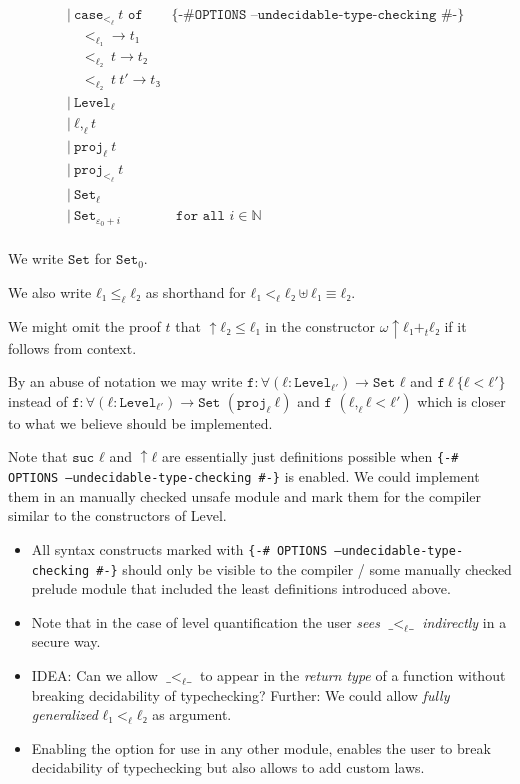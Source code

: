 \documentclass[runningheads,fleqn]{llncs}
\begin{document}
\begin{align*}
  &|\ \texttt{case}_{<_ℓ} \ t \texttt{ of } & \texttt{\{-\# OPTIONS --undecidable-type-checking \#-\}} \\
  & \quad <_{ℓ₁}→ t₁ \\
  & \quad <_{ℓ₂} \ t → t₂ \\
  & \quad <_{ℓ₂} \ t \ t′ → t₃ \\
  &|\ \texttt{Level}_ℓ \\
  &|\ ℓ ,_ℓ t \\  
  &|\ \texttt{proj}_ℓ \ t \\
  &|\ \texttt{proj}_{<_ℓ} \ t \\
  &|\ \texttt{Set}_ℓ \\
  &|\ \texttt{Set}_{ε_0+i} & \texttt{ for all } i ∈ ℕ \\
\end{align*}

We write $\texttt{Set}$ for $\texttt{Set}_0$.

We also write $ℓ₁ ≤_ℓ ℓ₂$ as shorthand for $ℓ₁ <_ℓ ℓ₂ ⊎ ℓ₁ ≡ ℓ₂$.


We might omit the proof $t$ that $↑ ℓ₂ ≤ ℓ₁$ in the constructor $ω ↑ ℓ₁ +_t ℓ₂$ if it follows from context.

By an abuse of notation we may write $\texttt{f} : ∀(ℓ : \texttt{Level}_{ℓ′}) → \texttt{Set } ℓ$ and $\texttt{f} \ ℓ \ \{ℓ<ℓ′\}$ instead of $\texttt{f} : ∀(ℓ : \texttt{Level}_{ℓ′}) → \texttt{Set } (\texttt{proj}_ℓ \ ℓ)$ and $\texttt{f } (ℓ ,_ℓ ℓ<ℓ′)$ which is closer to what we believe should be implemented.


Note that $\texttt{suc } ℓ$ and $↑ ℓ$ are essentially just definitions possible when \texttt{\{-\# OPTIONS --undecidable-type-checking \#-\}} is enabled.
We could implement them in an manually checked unsafe module and mark them for the compiler similar to the constructors of Level.

\begin{itemize}
 \item All syntax constructs marked with \texttt{\{-\# OPTIONS --undecidable-type-checking \#-\}} should only be visible to the compiler / some manually checked prelude module that included the least definitions introduced above. 
 \item Note that in the case of level quantification the user \emph{sees} $\texttt{\_}<_ℓ\texttt{\_}$ \emph{indirectly} in a secure way.
 \item IDEA: Can we allow $\texttt{\_}<_ℓ\texttt{\_}$ to appear in the \emph{return type} of a function without breaking decidability of typechecking? Further: We could allow \emph{fully generalized} $ℓ₁ <_ℓ ℓ₂$ as argument.
 \item Enabling the option for use in any other module, enables the user to break decidability of typechecking but also allows to add custom laws. 
\end{itemize}
\end{document}
